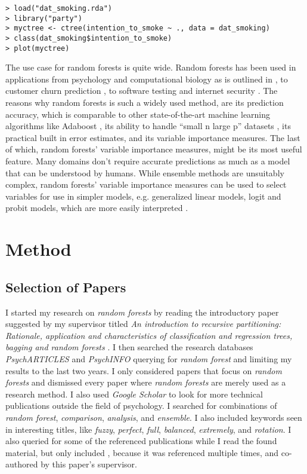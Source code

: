 \documentclass[a4paper,man,12pt,apacite]{apa6} %
\begin{document}
\begin{verbatim}
> load("dat_smoking.rda")
> library("party")
> myctree <- ctree(intention_to_smoke ~ ., data = dat_smoking)
> class(dat_smoking$intention_to_smoke)
> plot(myctree)
\end{verbatim}

The use case for random forests is quite wide.
Random forests has been used in applications from psychology and
computational biology as is outlined in \cite{strobl2009introduction},
to customer churn prediction \cite{xie2009customer},
to software testing \cite{guo2004robust} and internet security
\cite{zhang2005network}.
The reasons why random forests is such a widely used method,
are its prediction accuracy, which is comparable to other state-of-the-art
machine learning algorithms like Adaboost \cite{breiman2001random},
its ability to handle “small n large p” datasets \cite{strobl2009introduction},
its practical built in error estimates, and its variable importance measures.
The last of which, random forests' variable importance measures,
might be its most useful feature.
Many domains don't require accurate predictions as much as a model that can
be understood by humans.
While ensemble methods are unsuitably complex,
random forests' variable importance measures can be used to select variables
for use in simpler models, e.g.
generalized linear models, logit and probit models,
which are more easily interpreted \cite{strobl2009introduction}.


\section{Method}

\subsection{Selection of Papers}
I started my research on \emph{random forests} by reading the
introductory paper suggested by my supervisor titled
\emph{An introduction to recursive partitioning: Rationale, application
and characteristics of classification and regression trees, bagging and
random forests} \cite{strobl2009introduction}.
I then searched the research databases \emph{PsychARTICLES} and
\emph{PsychINFO} querying for \emph{random forest} and limiting my results
to the last two years.
I only considered papers that focus on \emph{random forests} and
dismissed every paper where \emph{random forests} are merely used as a
research method.
I also used \emph{Google Scholar} to look for more technical
publications outside the field of psychology.
I searched for combinations of \emph{random forest}, \emph{comparison},
\emph{analysis}, and \emph{ensemble}.
I also included keywords seen in interesting titles, like \emph{fuzzy},
\emph{perfect}, \emph{full}, \emph{balanced}, \emph{extremely}, and
\emph{rotation}.
I also queried for some of the referenced publications while I read the
found material, but only included \cite{strobl2008conditional}, because
it was referenced multiple times, and co-authored by this paper's
supervisor.
\end{document}
